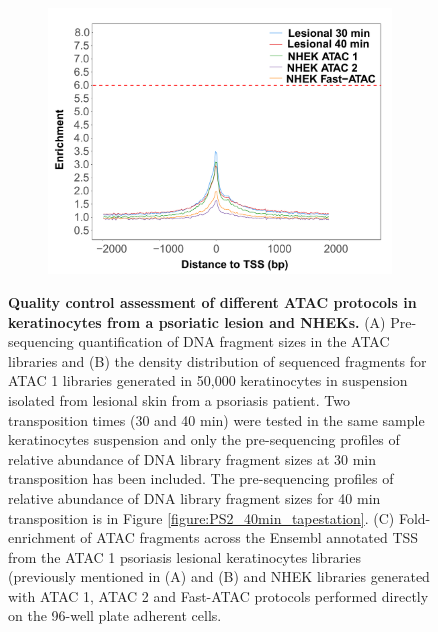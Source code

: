\begin{figure}[htbp]
\begin{subfigure}{0.45\textwidth}
\includegraphics[width=\textwidth]{./Results1/pdfs/ATAC_skin_TSS_enrichment_PS02_30_40min_NHEK_ATAC1_ATAC_2_FAST_ATAC}
\caption{\textbf{}} %
\end{subfigure}
\caption[Quality control assessment of different ATAC protocols in keratinocytes from a psoriatic lesion and NHEKs.]{\textbf{Quality control assessment of different ATAC protocols in keratinocytes from a psoriatic lesion and NHEKs.} (A) Pre-sequencing quantification of DNA fragment sizes in the ATAC libraries and (B) the density distribution of sequenced fragments for ATAC 1 libraries generated in 50,000 keratinocytes in suspension isolated from lesional skin from a psoriasis patient. Two transposition times (30 and 40 min) were tested in the same sample keratinocytes suspension and only the pre-sequencing profiles of relative abundance of DNA library fragment sizes at 30 min transposition has been included. The pre-sequencing profiles of relative abundance of DNA library fragment sizes for 40 min transposition is in Figure \ref{figure:PS2_40min_tapestation}. (C) Fold-enrichment of ATAC fragments across the Ensembl annotated TSS from the ATAC 1 psoriasis lesional keratinocytes libraries (previously mentioned in (A) and (B) and NHEK libraries generated with ATAC 1, ATAC 2 and Fast-ATAC protocols performed directly on the 96-well plate adherent cells.}
\label{figure:PS02_skin_ATAC_QC_assessment}
\end{figure} 


